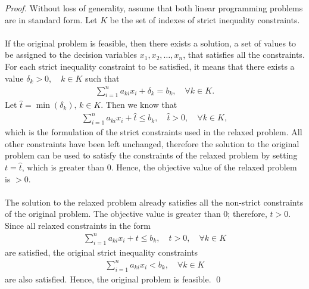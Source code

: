 \documentclass[runningheads]{llncs}
\begin{document}
    \begin{proof}
        Without loss of generality, assume that both linear programming problems are in standard form.
        Let $K$ be the set of indexes of strict inequality constraints.
        \\
         \\

        If the original problem is feasible, then there exists a solution, a set of values to be assigned to the decision variables $x_1, x_2, \ldots, x_n$, that satisfies all the constraints.
        For each strict inequality constraint to be satisfied, it means that there exists a value $\delta_k > 0, \quad k \in K$ such that
        \begin{align*}
            \sum_{i=1}^{n} a_{ki}x_{i} + \delta_k = b_k, \quad \forall k \in K .
        \end{align*}
        Let $\hat{t} = \min(\delta_k),\,  k \in K$.
        Then we know that
        \begin{align*}
            \sum_{i=1}^{n} a_{ki}x_{i} + \hat{t} \le b_k, \quad \hat{t} > 0, \quad \forall k \in K ,
        \end{align*}
        which is the formulation of the strict constraints used in the relaxed problem.
        All other constraints have been left unchanged, therefore the solution to the original problem can be used to satisfy the constraints of the relaxed problem by setting $t = \hat{t}$, which is greater than $0$.
        Hence, the objective value of the relaxed problem is $> 0$.
        \\
         \\

        The solution to the relaxed problem already satisfies all the non-strict constraints of the original problem.
        The objective value is greater than $0$; therefore, $t > 0$.
        Since all relaxed constraints in the form
        \begin{align*}
            \sum_{i=1}^{n} a_{ki}x_{i} + t \le b_k, \quad t > 0, \quad \forall k \in K 
        \end{align*}
        are satisfied, the original strict inequality constraints
        \begin{align*}
            \sum_{i=1}^{n} a_{ki}x_{i} < b_k, \quad \forall k \in K
        \end{align*}
        are also satisfied.
        Hence, the original problem is feasible.
        \qed
    \end{proof}
\end{document}
